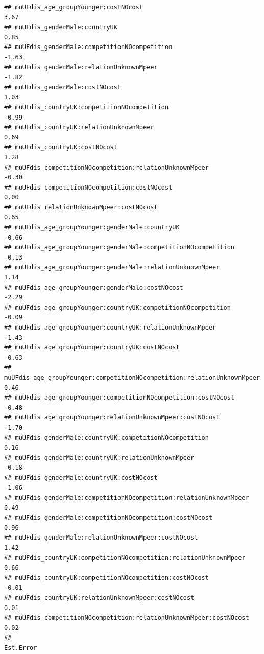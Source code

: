 \documentclass[
]{article}
\begin{document}
\begin{verbatim}
## muUFdis_age_groupYounger:costNOcost                                        3.67
## muUFdis_genderMale:countryUK                                               0.85
## muUFdis_genderMale:competitionNOcompetition                               -1.63
## muUFdis_genderMale:relationUnknownMpeer                                   -1.82
## muUFdis_genderMale:costNOcost                                              1.03
## muUFdis_countryUK:competitionNOcompetition                                -0.99
## muUFdis_countryUK:relationUnknownMpeer                                     0.69
## muUFdis_countryUK:costNOcost                                               1.28
## muUFdis_competitionNOcompetition:relationUnknownMpeer                     -0.30
## muUFdis_competitionNOcompetition:costNOcost                                0.00
## muUFdis_relationUnknownMpeer:costNOcost                                    0.65
## muUFdis_age_groupYounger:genderMale:countryUK                             -0.66
## muUFdis_age_groupYounger:genderMale:competitionNOcompetition              -0.13
## muUFdis_age_groupYounger:genderMale:relationUnknownMpeer                   1.14
## muUFdis_age_groupYounger:genderMale:costNOcost                            -2.29
## muUFdis_age_groupYounger:countryUK:competitionNOcompetition               -0.09
## muUFdis_age_groupYounger:countryUK:relationUnknownMpeer                   -1.43
## muUFdis_age_groupYounger:countryUK:costNOcost                             -0.63
## muUFdis_age_groupYounger:competitionNOcompetition:relationUnknownMpeer     0.46
## muUFdis_age_groupYounger:competitionNOcompetition:costNOcost              -0.48
## muUFdis_age_groupYounger:relationUnknownMpeer:costNOcost                  -1.70
## muUFdis_genderMale:countryUK:competitionNOcompetition                      0.16
## muUFdis_genderMale:countryUK:relationUnknownMpeer                         -0.18
## muUFdis_genderMale:countryUK:costNOcost                                   -1.06
## muUFdis_genderMale:competitionNOcompetition:relationUnknownMpeer           0.49
## muUFdis_genderMale:competitionNOcompetition:costNOcost                     0.96
## muUFdis_genderMale:relationUnknownMpeer:costNOcost                         1.42
## muUFdis_countryUK:competitionNOcompetition:relationUnknownMpeer            0.66
## muUFdis_countryUK:competitionNOcompetition:costNOcost                     -0.01
## muUFdis_countryUK:relationUnknownMpeer:costNOcost                          0.01
## muUFdis_competitionNOcompetition:relationUnknownMpeer:costNOcost           0.02
##                                                                        Est.Error

\end{verbatim}
\end{document}
